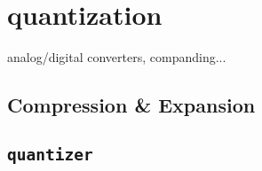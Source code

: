 % 
%

\newpage
\section{quantization}
\label{module:quantization}
analog/digital converters, companding...

\subsection{Compression \& Expansion}
\label{module:quantization:companding}


\subsection{{\tt quantizer}}
\label{module:quantization:quantizer}


